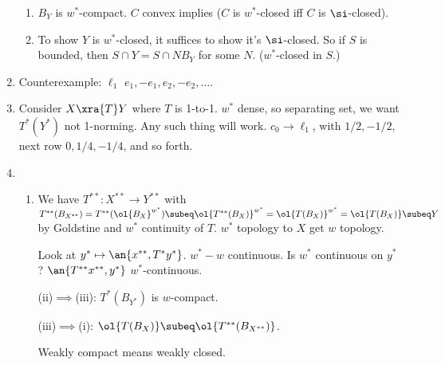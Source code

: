 \begin{enumerate}
\begin{enumerate}


\item  {}
$B_Y$ is $w^*$-compact. $C$ convex implies ($C$ is $w^*$-closed iff $C$ is $\si$-closed).
\item{}

To show $Y$ is $w^*$-closed, it suffices to show it's $\si$-closed. So if $S$ is bounded, then $S\cap Y=S\cap NB_Y$ for some $N$. ($w^*$-closed in $S$.)
\end{enumerate}
\item {} Counterexample: $\ell_1$ $e_1, -e_1,e_2,-e_2,\ldots$.  
\item {} Consider $X\xra{T}Y$ where $T$ is 1-to-1. $w^*$ dense, so separating set, we want $T^*(Y^*)$ not 1-norming. Any such thing will work. $c_0\to \ell_1$, with $1/2,-1/2$, next row $0,1/4,-1/4$, and so forth. 
\item %
\begin{enumerate}
\item
We have $T^{**}:X^{**}\to Y^{**}$ with $T^{**}(B_{X^{**}})=T^{**}(\ol{B_X}^{w^*})\subeq \ol{T^{**}(B_X)}^{w^*}=\ol{T(B_X)}^{w^*}=\ol{T(B_X)}\subeq Y$
by Goldstine and $w^*$ continuity of $T$.
$w^*$ topology to $X$ get $w$ topology.

Look at $y^*\mapsto \an{x^{**}, T^*y^*}$.
$w^*-w$ continuous.  Is $w^*$ continuous on $y^*$? $\an{T^{**}x^{**},y^*}$ $w^*$-continuous.

(ii)$\implies$(iii): $T^*(B_{Y^*})$ is $w$-compact.

(iii)$\implies$(i): $\ol{T(B_X)}\subeq \ol{T^{**}(B_{X^{**}})}$. 

Weakly compact means weakly closed.
\end{enumerate}
\end{enumerate}
